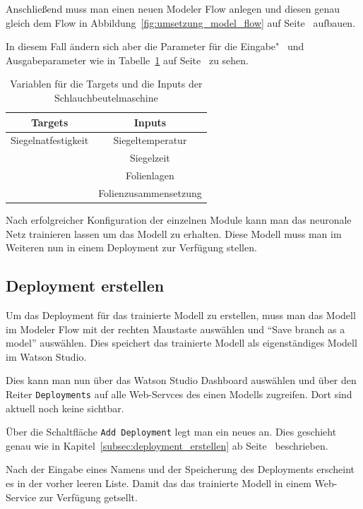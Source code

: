 Anschließend muss man einen neuen Modeler Flow anlegen und diesen genau gleich dem Flow in
Abbildung~\ref{fig:umsetzung_model_flow} auf Seite~\pageref{fig:umsetzung_model_flow} aufbauen.

In diesem Fall ändern sich aber die Parameter für die Eingabe"~ und Ausgabeparameter wie in
Tabelle~\ref{tab:targets_inputs_siegeln} auf Seite~\pageref{tab:targets_inputs_siegeln} zu sehen.

\begin{table}[h]
    \centering
    \begin{tabular}{|c|c|}
        \hline
        \textbf{Targets} & \textbf{Inputs}\\
        \hline
        \hline
        Siegelnatfestigkeit & Siegeltemperatur\\
        \hline
        & Siegelzeit\\
        \hline
        & Folienlagen\\
        \hline
        & Folienzusammensetzung\\
        \hline
    \end{tabular}
    \caption{Variablen für die Targets und die Inputs der Schlauchbeutelmaschine}
    \label{tab:targets_inputs_siegeln}
\end{table}

Nach erfolgreicher Konfiguration der einzelnen Module kann man das neuronale Netz trainieren lassen um das Modell zu
erhalten. Diese Modell muss man im Weiteren nun in einem Deployment zur Verfügung stellen.

\subsection{Deployment erstellen}
Um das Deployment für das trainierte Modell zu erstellen, muss man das Modell im Modeler Flow mit der rechten Maustaste
auswählen und \enquote{Save branch as a model} auswählen. Dies speichert das trainierte Modell als eigenständiges Modell
im Watson Studio.

Dies kann man nun über das Watson Studio Dashboard auswählen und über den Reiter \texttt{Deployments} auf alle
Web-Servces des einen Modells zugreifen. Dort sind aktuell noch keine sichtbar.

Über die Schaltfläche \texttt{Add Deployment} legt man ein neues an. Dies geschieht genau wie in
Kapitel~\ref{subsec:deployment_erstellen} ab Seite~\pageref{subsec:deployment_erstellen} beschrieben.

Nach der Eingabe eines Namens und der Speicherung des Deployments erscheint es in der vorher leeren Liste. Damit das das
trainierte Modell in einem Web-Service zur Verfügung getsellt.


